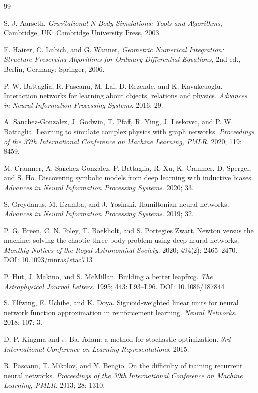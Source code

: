 \documentclass[a4paper,journal]{IEEEtran}
\begin{document}
\balance
\begin{thebibliography}{99}

 S. J. Aarseth, \emph{Gravitational N-Body Simulations: Tools and Algorithms}, Cambridge, UK: Cambridge University Press, 2003.

 E. Hairer, C. Lubich, and G. Wanner, \emph{Geometric Numerical Integration: Structure-Preserving Algorithms for Ordinary Differential Equations}, 2nd ed., Berlin, Germany: Springer, 2006.

 P. W. Battaglia, R. Pascanu, M. Lai, D. Rezende, and K. Kavukcuoglu. Interaction networks for learning about objects, relations and physics. \emph{Advances in Neural Information Processing Systems}. 2016; 29.

 A. Sanchez-Gonzalez, J. Godwin, T. Pfaff, R. Ying, J. Leskovec, and P. W. Battaglia. Learning to simulate complex physics with graph networks. \emph{Proceedings of the 37th International Conference on Machine Learning, PMLR}. 2020; 119: 8459.

 M. Cranmer, A. Sanchez-Gonzalez, P. Battaglia, R. Xu, K. Cranmer, D. Spergel, and S. Ho. Discovering symbolic models from deep learning with inductive biases. \emph{Advances in Neural Information Processing Systems}. 2020; 33.

 S. Greydanus, M. Dzamba, and J. Yosinski. Hamiltonian neural networks. \emph{Advances in Neural Information Processing Systems}. 2019; 32.

 P. G. Breen, C. N. Foley, T. Boekholt, and S. Portegies Zwart. Newton versus the machine: solving the chaotic three-body problem using deep neural networks. \emph{Monthly Notices of the Royal Astronomical Society}. 2020; 494(2): 2465--2470. DOI: \href{https://doi.org/10.1093/mnras/staa713}{10.1093/mnras/staa713}

 P. Hut, J. Makino, and S. McMillan. Building a better leapfrog. \emph{The Astrophysical Journal Letters}. 1995; 443: L93--L96. DOI: \href{https://doi.org/10.1086/187844}{10.1086/187844}

 S. Elfwing, E. Uchibe, and K. Doya. Sigmoid-weighted linear units for neural network function approximation in reinforcement learning. \emph{Neural Networks}. 2018; 107: 3.

 D. P. Kingma and J. Ba. Adam: a method for stochastic optimization. \emph{3rd International Conference on Learning Representations}. 2015.

 R. Pascanu, T. Mikolov, and Y. Bengio. On the difficulty of training recurrent neural networks. \emph{Proceedings of the 30th International Conference on Machine Learning, PMLR}. 2013; 28: 1310.

\end{thebibliography}
\end{document}
